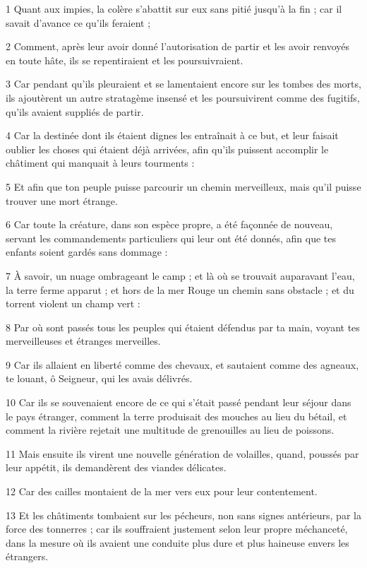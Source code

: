 \par 1 Quant aux impies, la colère s'abattit sur eux sans pitié jusqu'à la fin ; car il savait d'avance ce qu'ils feraient ;
\par 2 Comment, après leur avoir donné l'autorisation de partir et les avoir renvoyés en toute hâte, ils se repentiraient et les poursuivraient.
\par 3 Car pendant qu'ils pleuraient et se lamentaient encore sur les tombes des morts, ils ajoutèrent un autre stratagème insensé et les poursuivirent comme des fugitifs, qu'ils avaient suppliés de partir.
\par 4 Car la destinée dont ils étaient dignes les entraînait à ce but, et leur faisait oublier les choses qui étaient déjà arrivées, afin qu'ils puissent accomplir le châtiment qui manquait à leurs tourments :
\par 5 Et afin que ton peuple puisse parcourir un chemin merveilleux, mais qu'il puisse trouver une mort étrange.
\par 6 Car toute la créature, dans son espèce propre, a été façonnée de nouveau, servant les commandements particuliers qui leur ont été donnés, afin que tes enfants soient gardés sans dommage :
\par 7 À savoir, un nuage ombrageant le camp ; et là où se trouvait auparavant l'eau, la terre ferme apparut ; et hors de la mer Rouge un chemin sans obstacle ; et du torrent violent un champ vert :
\par 8 Par où sont passés tous les peuples qui étaient défendus par ta main, voyant tes merveilleuses et étranges merveilles.
\par 9 Car ils allaient en liberté comme des chevaux, et sautaient comme des agneaux, te louant, ô Seigneur, qui les avais délivrés.
\par 10 Car ils se souvenaient encore de ce qui s'était passé pendant leur séjour dans le pays étranger, comment la terre produisait des mouches au lieu du bétail, et comment la rivière rejetait une multitude de grenouilles au lieu de poissons.
\par 11 Mais ensuite ils virent une nouvelle génération de volailles, quand, poussés par leur appétit, ils demandèrent des viandes délicates.
\par 12 Car des cailles montaient de la mer vers eux pour leur contentement.
\par 13 Et les châtiments tombaient sur les pécheurs, non sans signes antérieurs, par la force des tonnerres ; car ils souffraient justement selon leur propre méchanceté, dans la mesure où ils avaient une conduite plus dure et plus haineuse envers les étrangers.
